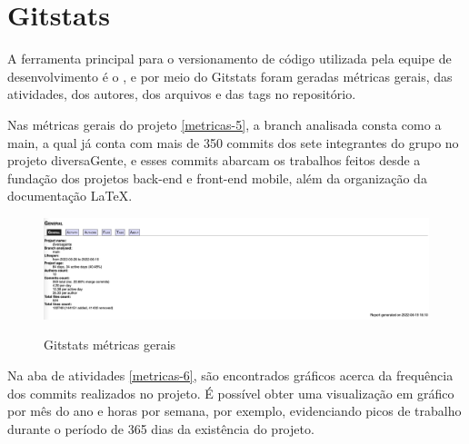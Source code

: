 \pagebreak

\section{Gitstats}

A ferramenta principal para o versionamento de código utilizada pela equipe de desenvolvimento é o , e por meio do Gitstats foram geradas métricas gerais, das atividades, dos autores, dos arquivos e das tags no repositório. 

Nas métricas gerais do projeto \autoref{metricas-5}, a branch analisada consta como a main, a qual já conta com mais de 350 commits dos sete integrantes do grupo no projeto diversaGente, e esses commits abarcam os trabalhos feitos desde a fundação dos projetos back-end e front-end mobile, além da organização da documentação LaTeX. 

\begin{figure}[htb]
	\centering
	\caption{\label{fig_arq_virado}Gitstats métricas gerais}
	\includegraphics[width=1.00\textwidth]{anexos/metricas5.png}
	\label{metricas-5}
\end{figure}

\pagebreak

\begin{itemize}

\end{itemize}

Na aba de atividades \autoref{metricas-6}, são encontrados gráficos acerca da frequência dos commits realizados no projeto. É possível obter uma visualização em gráfico por mês do ano e horas por semana, por exemplo, evidenciando picos de trabalho durante o período de 365 dias da existência do projeto.


